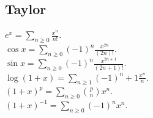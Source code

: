\subsection{Taylor}
\ci $e^x = \sum_{n\geq 0} \frac{x^n}{n!}$. \\
\ci $\cos x = \sum_{n\geq 0} (-1)^n \frac{x^{2n}}{(2n)!}$. \\
\ci $\sin x = \sum_{n\geq 0} (-1)^n \frac{x^{2n+1}}{(2n+1)!}$. \\
\ci $\log (1+x) = \sum_{n\geq 1} (-1)^n+1 \frac{x^n}{n}$. \\
\ci $(1+x)^p = \sum_{n\geq 0} \binom{p}{n} x^n$. \\
\ci $(1+x)^{-1} = \sum_{n\geq 0} (-1)^n x^n$.
